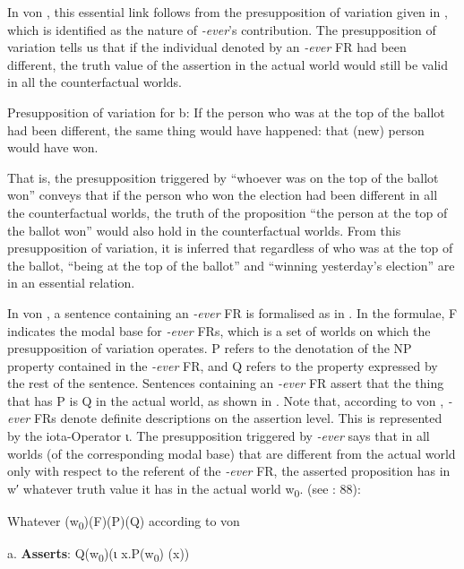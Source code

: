 \documentclass[output=paper]{langscibook}
\begin{document}
  In von \citet{Fintel2000}, this essential link follows from the presupposition of variation given in , which is identified as the nature of \textit{\nobreakdash-ever}’s contribution. The presupposition of variation tells us that if the individual denoted by an \textit{\nobreakdash-ever} FR had been different, the truth value of the assertion in the actual world would still be valid in all the counterfactual worlds.

\label{bkm:Ref533762335}  Presupposition of variation for b: If the person who was at the top of the ballot had been different, the same thing would have happened: that (new) person would have won.

That is, the presupposition triggered by “whoever was on the top of the ballot won” conveys that if the person who won the election had been different in all the counterfactual worlds, the truth of the proposition “the person at the top of the ballot won” would also hold in the counterfactual worlds. From this presupposition of variation, it is inferred that regardless of who was at the top of the ballot, “being at the top of the ballot” and “winning yesterday’s election” are in an essential relation.

  In von \citet{Fintel2000}, a sentence containing an \textit{\nobreakdash-ever} FR is formalised as in . In the formulae, F indicates the modal base for \textit{\nobreakdash-ever} FRs, which is a set of worlds on which the presupposition of variation operates. P refers to the denotation of the NP property contained in the \textit{\nobreakdash-ever} FR, and Q refers to the property expressed by the rest of the sentence. Sentences containing an \textit{\nobreakdash-ever} FR assert that the thing that has P is Q in the actual world, as shown in . Note that, according to von \citet{Fintel2000}, \textit{{}-ever} FRs denote definite descriptions on the assertion level. This is represented by the iota-Operator ι. The presupposition triggered by \textit{\nobreakdash-ever} says that in all worlds (of the corresponding modal base) that are different from the actual world only with respect to the referent of the \textit{\nobreakdash-ever} FR, the asserted proposition has in w′ whatever truth value it has in the actual world w\textsubscript{0}. (see \citealt{ChoiRomero2008}: 88):

\label{bkm:Ref533762404}  Whatever (w\textsubscript{0})(F)(P)(Q) according to von \citet{Fintel2000}

  a.  \textbf{Asserts}: Q(w\textsubscript{0})(ι x.P(w\textsubscript{0}) (x))
\end{document}
